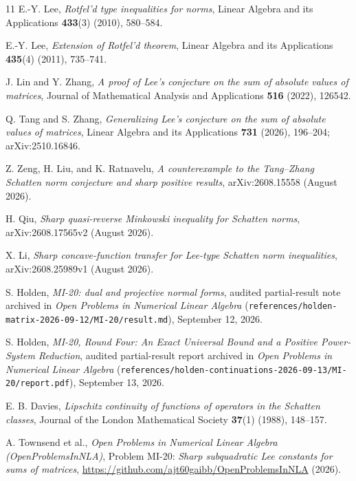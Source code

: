 \documentclass[10pt,letterpaper]{article}
\begin{document}
\begin{thebibliography}{11}
\small
{}
E.-Y. Lee, \emph{Rotfel'd type inequalities for norms}, Linear Algebra and its Applications \textbf{433}(3) (2010), 580--584.

E.-Y. Lee, \emph{Extension of Rotfel'd theorem}, Linear Algebra and its Applications \textbf{435}(4) (2011), 735--741.

J. Lin and Y. Zhang, \emph{A proof of Lee's conjecture on the sum of absolute values of matrices}, Journal of Mathematical Analysis and Applications \textbf{516} (2022), 126542.

Q. Tang and S. Zhang, \emph{Generalizing Lee's conjecture on the sum of absolute values of matrices}, Linear Algebra and its Applications \textbf{731} (2026), 196--204; arXiv:2510.16846.

Z. Zeng, H. Liu, and K. Ratnavelu, \emph{A counterexample to the Tang--Zhang Schatten norm conjecture and sharp positive results}, arXiv:2608.15558 (August 2026).

H. Qiu, \emph{Sharp quasi-reverse Minkowski inequality for Schatten norms}, arXiv:2608.17565v2 (August 2026).

X. Li, \emph{Sharp concave-function transfer for Lee-type Schatten norm inequalities}, arXiv:2608.25989v1 (August 2026).

S. Holden, \emph{MI-20: dual and projective normal forms}, audited partial-result note archived in \emph{Open Problems in Numerical Linear Algebra} (\nolinkurl{references/holden-matrix-2026-09-12/MI-20/result.md}), September 12, 2026.

S. Holden, \emph{MI-20, Round Four: An Exact Universal Bound and a Positive Power-System Reduction}, audited partial-result report archived in \emph{Open Problems in Numerical Linear Algebra} (\nolinkurl{references/holden-continuations-2026-09-13/MI-20/report.pdf}), September 13, 2026.

E. B. Davies, \emph{Lipschitz continuity of functions of operators in the Schatten classes}, Journal of the London Mathematical Society \textbf{37}(1) (1988), 148--157.

A. Townsend et al., \emph{Open Problems in Numerical Linear Algebra (OpenProblemsInNLA)}, Problem MI-20: \emph{Sharp subquadratic Lee constants for sums of matrices}, \url{https://github.com/ajt60gaibb/OpenProblemsInNLA} (2026).
\end{thebibliography}
\end{document}
